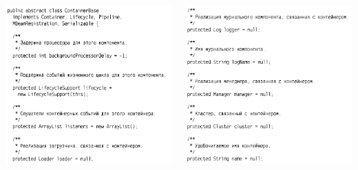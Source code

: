 \documentclass[12pt,pdf,utf8,ukrainian,aspectratio=169]{beamer}
\makeatletter
\newcommand*{\currentname}{\@currentlabelname}
\makeatother
\begin{document}
	\begin{frame}\frametitle{\currentname}
		\begin{columns}
			\begin{column}{7cm}
				\includegraphics[scale=0.35]{clean_code_11_1.png}
			\end{column}
			\begin{column}{7cm} 
				\includegraphics[scale=0.35]{clean_code_11_2.png}
			\end{column}
		\end{columns}	
	\end{frame}	
\end{document}

